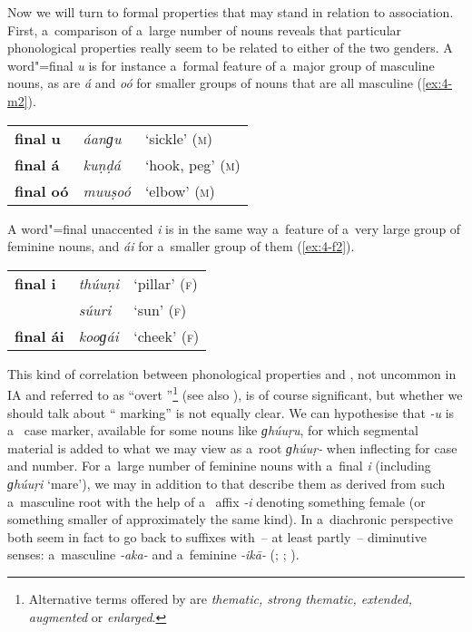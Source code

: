 Now we will turn to formal properties that may stand in relation to  association. First, a~comparison of a~large number of nouns reveals that particular phonological properties really seem to be related to either of the two genders. A word"=final \textit{u} is for instance a~formal feature of a~major group of masculine nouns, as are \textit{á} and \textit{oó} for smaller groups of nouns that are all masculine (\ref{ex:4-m2}).


\begin{exe}
\extab
\label{ex:4-m2}
\begin{tabularx}{\textwidth}{ l l l }
\textbf{final u} &
\textit{áanɡu} &
`sickle' (\textsc{m})\\
\textbf{final á} &
\textit{kuṇḍá} &
`hook, peg' (\textsc{m})\\
\textbf{final oó} &
\textit{muuṣoó} &
`elbow' (\textsc{m})\\
\end{tabularx}
\end{exe}

A word"=final unaccented \textit{i} is in the same way a~feature of a~very large group of feminine nouns, and \textit{ái} for a~smaller group of them (\ref{ex:4-f2}).


\begin{exe}
\extab
\label{ex:4-f2}
\begin{tabularx}{\textwidth}{ l l l }
\textbf{final i} &
\textit{thúuṇi} &
`pillar' (\textsc{f})\\
&
\textit{súuri} &
`sun' (\textsc{f})\\
\textbf{final ái} &
\textit{kooɡái} &
`cheek' (\textsc{f})\\
\end{tabularx}
\end{exe}

This kind of correlation between phonological properties and , not uncommon in IA \citep[219]{masica1991} and referred to as ``overt ''\footnote{Alternative terms offered by \citet[219]{masica1991} are \textit{thematic, strong thematic, extended, augmented} or \textit{enlarged}.} (see also \citealt[44, 62]{corbett1991}), is of course significant, but whether we should talk about `` marking'' is not equally clear. We can hypothesise that \textit{-u} is a~ case marker, available for some nouns like \textit{ɡhúuṛu}, for which segmental material is added to what we may view as a~root \textit{ɡhúuṛ-} when inflecting for case and number. For a~large number of feminine nouns with a~final \textit{i} (including \textit{ɡhúuṛi} `mare'), we may in addition to that describe them as derived from such a~masculine root with the help of a~ affix \textit{-i} denoting something female (or something smaller of approximately the same kind). In a~diachronic perspective both seem in fact to go back to \iliOIA {} suffixes with~-- at least partly~-- diminutive senses: a~masculine \textit{-aka-} and a~feminine \textit{-ikā-} (\citealt[222]{masica1991}; \citealt[15]{morgenstierne1941}; \citealt[29]{buddruss1967}).


